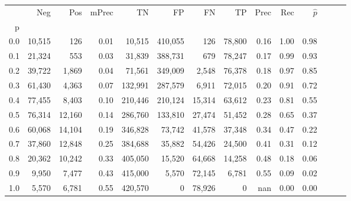 \begin{tabular}{rrrrrrrrrrrrrr}
\toprule
{} &     Neg &     Pos & mPrec &       TN &       FP &      FN &      TP &  Prec &   Rec & $\hat{p}$ \\
p   &         &         &       &          &          &         &         &       &       &           \\
\midrule
0.0 &  10,515 &     126 &  0.01 &   10,515 &  410,055 &     126 &  78,800 &  0.16 &  1.00 &      0.98 \\
0.1 &  21,324 &     553 &  0.03 &   31,839 &  388,731 &     679 &  78,247 &  0.17 &  0.99 &      0.93 \\
0.2 &  39,722 &   1,869 &  0.04 &   71,561 &  349,009 &   2,548 &  76,378 &  0.18 &  0.97 &      0.85 \\
0.3 &  61,430 &   4,363 &  0.07 &  132,991 &  287,579 &   6,911 &  72,015 &  0.20 &  0.91 &      0.72 \\
0.4 &  77,455 &   8,403 &  0.10 &  210,446 &  210,124 &  15,314 &  63,612 &  0.23 &  0.81 &      0.55 \\
0.5 &  76,314 &  12,160 &  0.14 &  286,760 &  133,810 &  27,474 &  51,452 &  0.28 &  0.65 &      0.37 \\
0.6 &  60,068 &  14,104 &  0.19 &  346,828 &   73,742 &  41,578 &  37,348 &  0.34 &  0.47 &      0.22 \\
0.7 &  37,860 &  12,848 &  0.25 &  384,688 &   35,882 &  54,426 &  24,500 &  0.41 &  0.31 &      0.12 \\
0.8 &  20,362 &  10,242 &  0.33 &  405,050 &   15,520 &  64,668 &  14,258 &  0.48 &  0.18 &      0.06 \\
0.9 &   9,950 &   7,477 &  0.43 &  415,000 &    5,570 &  72,145 &   6,781 &  0.55 &  0.09 &      0.02 \\
1.0 &   5,570 &   6,781 &  0.55 &  420,570 &        0 &  78,926 &       0 &   nan &  0.00 &      0.00 \\
\bottomrule
\end{tabular}
